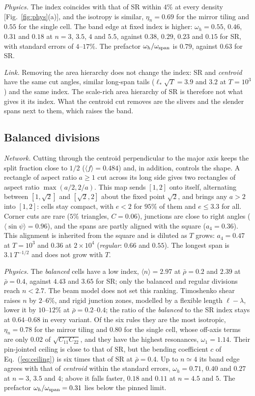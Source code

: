 \documentclass[aps,pre,twocolumn,superscriptaddress,amsmath,amssymb,floatfix]{revtex4-2}
\begin{document}
\emph{Physics.} The index coincides with that of SR within $4\%$ at every density
[Fig.~\ref{fig:phys}(a)], and the isotropy is similar, $\eta_n=0.69$ for the mirror tiling
and $0.55$ for the single cell. The band edge at fixed index is higher:
$\omega_h=0.55$, $0.46$, $0.31$ and $0.18$ at $n=3$, $3.5$, $4$ and $5.5$, against $0.38$,
$0.29$, $0.23$ and $0.15$ for SR, with standard errors of $4$--$17\%$. The prefactor $\omega_h/\omega_{\rm span}$ is $0.79$, against $0.63$ for SR.

\emph{Link.} Removing the area hierarchy does not change the index: SR and
\emph{centroid} have the same cut angles, similar long-span tails ($\ell_*\sqrt T=3.9$ and
$3.2$ at $T=10^3$) and the same index. The scale-rich area hierarchy of SR is therefore
not what gives it its index. What the centroid cut removes are the slivers and the
slender spans next to them, which raises the band.

\subsection{Balanced divisions}
\label{sec:balanced}
\emph{Network.} Cutting through the centroid perpendicular to the major axis keeps the
split fraction close to $1/2$ ($\langle f\rangle=0.484$) and, in addition, controls the
shape. A rectangle of aspect ratio $a\ge1$ cut across its long side gives two rectangles
of aspect ratio $\max(a/2,2/a)$. This map sends $[1,2]$ onto itself, alternating between
$[1,\sqrt2]$ and $[\sqrt2,2]$ about the fixed point $\sqrt2$, and brings any $a>2$ into
$[1,2]$: cells stay compact, with $e<2$ for $95\%$ of them and $e\le3.3$ for all. Corner
cuts are rare ($5\%$ triangles, $C=0.06$), junctions are close to right angles
($\langle\sin\psi\rangle=0.96$), and the spans are partly aligned with the square
($a_4=0.36$). This alignment is inherited from the square and is diluted as $T$ grows:
$a_4=0.47$ at $T=10^3$ and $0.36$ at $2\times10^4$ (\emph{regular}: $0.66$ and $0.55$). The
longest span is $3.1\,T^{-1/2}$ and does not grow with $T$.

\emph{Physics.} The \emph{balanced} cells have a low index, $\langle n\rangle=2.97$ at
$\bar\rho=0.2$ and $2.39$ at $\bar\rho=0.4$, against $4.43$ and $3.65$ for SR; only the
balanced and regular divisions reach $n<2.7$. The beam model does not set this ranking.
Timoshenko shear raises $n$ by $2$--$6\%$, and rigid junction zones, modelled by a flexible
length $\ell-\lambda$, lower it by $10$--$12\%$ at $\bar\rho=0.2$--$0.4$; the ratio of the
\emph{balanced} to the SR index stays at $0.64$--$0.68$ in every variant. Of the six rules
they are the most isotropic, $\eta_n=0.78$ for the mirror tiling and $0.80$ for the single
cell, whose off-axis terms are only $0.02$ of $\sqrt{C_{11}C_{22}}$, and they have the highest
resonances, $\omega_1=1.14$. Their pin-jointed ceiling is close to that of SR, but the
bending coefficient $c$ of Eq.~(\ref{eq:ceiling}) is six times that of SR at $\bar\rho=0.4$.
Up to $n\simeq4$ its band edge agrees with that of \emph{centroid} within the standard
errors, $\omega_h=0.71$, $0.40$ and $0.27$ at $n=3$, $3.5$ and $4$; above it falls faster,
$0.18$ and $0.11$ at $n=4.5$ and $5$. The prefactor $\omega_h/\omega_{\rm span}=0.31$ lies below the pinned
limit.
\end{document}
